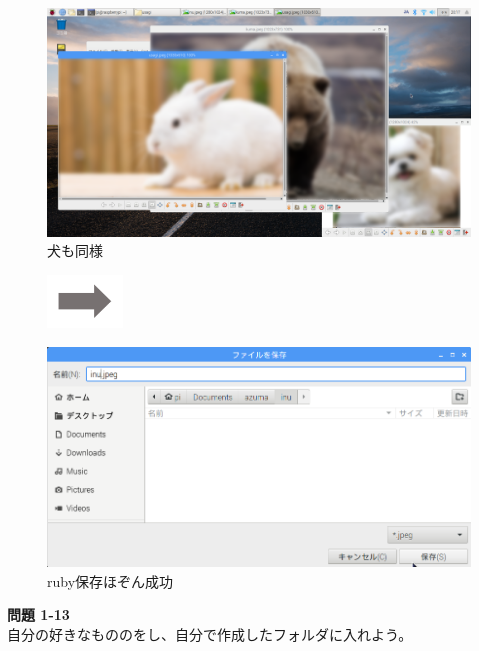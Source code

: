 \begin{figure}[t]
  \bigskip

  \begin{minipage}{0.4\textwidth}
    \includegraphics[width=\linewidth]{text01-img/textbook-img105.png}
     犬も同様
  \end{minipage}
  \includegraphics[width=2cm]{text01-img/textbook-img073.png}
  \begin{minipage}{0.4\textwidth}
    \includegraphics[width=\linewidth]{text01-img/textbook-img104.png}
     ruby{保存}{ほぞん}成功
  \end{minipage}

  \centering
\end{figure}

\bigskip

\noindent \textbf{問題 1-13}\\
自分の好きなもののをし、自分で作成したフォルダに入れよう。

\clearpage

